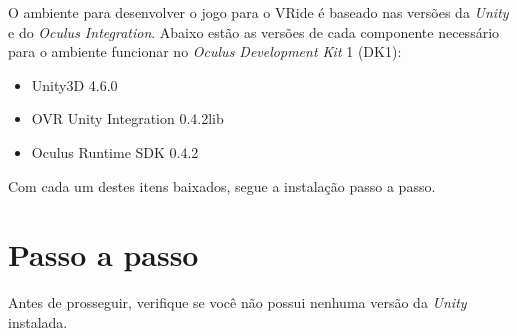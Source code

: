 O ambiente para desenvolver o jogo para o VRide é baseado nas versões da \textit{Unity} e do \textit{Oculus Integration}. Abaixo estão as versões de cada componente necessário para o ambiente funcionar no \textit{Oculus Development Kit} 1 (DK1):

\begin{itemize}
\item Unity3D 4.6.0
\item OVR Unity Integration 0.4.2lib
\item Oculus Runtime SDK 0.4.2
\end{itemize}

Com cada um destes itens baixados, segue a instalação passo a passo.

\section{Passo a passo}

Antes de prosseguir, verifique se você não possui nenhuma versão da \textit{Unity} instalada.

